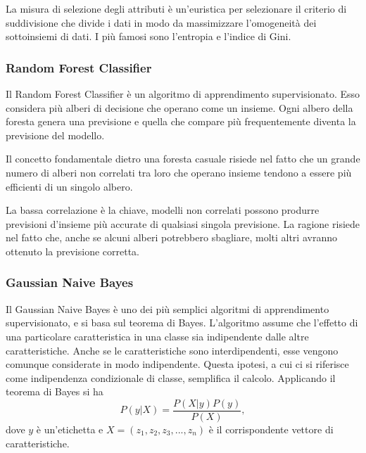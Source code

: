 \documentclass[12pt,italian]{report}
\begin{document}
La misura di selezione degli attributi è un'euristica per selezionare il criterio di suddivisione che divide i dati in modo da massimizzare l'omogeneità dei sottoinsiemi di dati. I più famosi sono l'entropia e l'indice di Gini. \cite{DataMiningandKnowledgeDiscoveryHandbook}

\subsubsection{Random Forest Classifier}
Il Random Forest Classifier è un algoritmo di apprendimento supervisionato. Esso considera più alberi di decisione che operano come un insieme. Ogni albero della foresta genera una previsione e quella che compare più frequentemente diventa la previsione del modello. \cite{RandomForest}

Il concetto fondamentale dietro una foresta casuale risiede nel fatto che un grande numero di alberi non correlati tra loro che operano insieme tendono a essere più efficienti di un singolo albero.

La bassa correlazione è la chiave, modelli non correlati possono produrre previsioni d'insieme più accurate di qualsiasi singola previsione. La ragione risiede nel fatto che, anche se alcuni alberi potrebbero sbagliare, molti altri avranno ottenuto la previsione corretta.
\subsubsection{Gaussian Naive Bayes}
Il Gaussian Naive Bayes è uno dei più semplici algoritmi di apprendimento supervisionato, e si basa sul teorema di Bayes. L'algoritmo assume che l'effetto di una particolare caratteristica in una classe sia indipendente dalle altre caratteristiche. Anche se le caratteristiche sono interdipendenti, esse vengono comunque considerate in modo indipendente\cite{Mitchell97}. Questa ipotesi, a cui ci si riferisce come indipendenza condizionale di classe, semplifica il calcolo.
Applicando il teorema di Bayes si ha
\begin{equation}
P(y | X) = \frac{P(X | y) P(y)}{P(X)},
\end{equation}
dove $y$ è un'etichetta e $X = (z_1, z_2, z_3,...,z_n)$ è il corrispondente vettore di caratteristiche.
\end{document}
